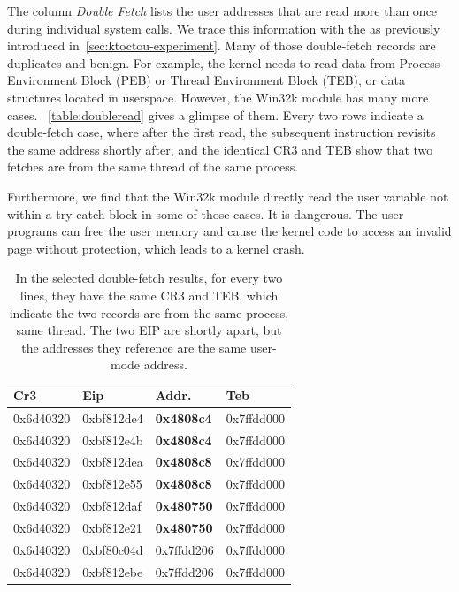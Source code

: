 The column \textit{Double Fetch} lists the user addresses that are read more than once during individual system calls. We trace this information with the \toolname as previously introduced in~\autoref{sec:ktoctou-experiment}. Many of those double-fetch records are duplicates and benign. For example, the kernel needs to read data from Process Environment Block (PEB) or Thread Environment Block (TEB), or data structures located in userspace.  However, the Win32k module has many more cases. ~\autoref{table:doubleread} gives a glimpse of them. Every two rows indicate a double-fetch case, where after the first read, the subsequent instruction revisits the same address shortly after, and the identical CR3 and TEB show that two fetches are from the same thread of the same process.

Furthermore, we find that the Win32k module directly read the user variable not within a try-catch block in some of those cases. It is dangerous. The user programs can free the user memory and cause the kernel code to access an invalid page without protection, which leads to a kernel crash.


\vspace*{-\baselineskip}
\begin{center}
	\begin{table}[ht]
		\small
		\caption{In the selected double-fetch results, for every two lines, they have the same CR3 and TEB, which indicate the two records are from the same process, same thread. The two EIP are shortly apart, but the addresses they reference are the same user-mode address.}
		\label{table:doubleread}
		\centering
		\begin{tabular}{@{}>{\centering\arraybackslash}m{2.05cm}@{}|
				@{}>{\centering\arraybackslash}m{2.05cm}@{}|
				@{}>{\centering\arraybackslash}m{2.05cm}@{}|
				@{}>{\centering\arraybackslash}m{2.05cm}@{} } 
			\hline
			Cr3 & Eip & Addr. & Teb \\
			\hline
			0x6d40320 & 0xbf812de4 & \textbf{0x4808c4} & 0x7ffdd000 \\
			0x6d40320 & 0xbf812e4b & \textbf{0x4808c4} & 0x7ffdd000 \\
			\hline
			0x6d40320 & 0xbf812dea & \textbf{0x4808c8} & 0x7ffdd000 \\
			0x6d40320 & 0xbf812e55 & \textbf{0x4808c8} & 0x7ffdd000 \\
			\hline
			0x6d40320 & 0xbf812daf & \textbf{0x480750} & 0x7ffdd000 \\
			0x6d40320 & 0xbf812e21 & \textbf{0x480750} & 0x7ffdd000 \\
			\hline
			0x6d40320 & 0xbf80c04d & 0x7ffdd206 & 0x7ffdd000 \\
			0x6d40320 & 0xbf812ebe & 0x7ffdd206 & 0x7ffdd000 \\
			\hline
		\end{tabular}
	\end{table}
\end{center}
\vspace*{-\baselineskip}



